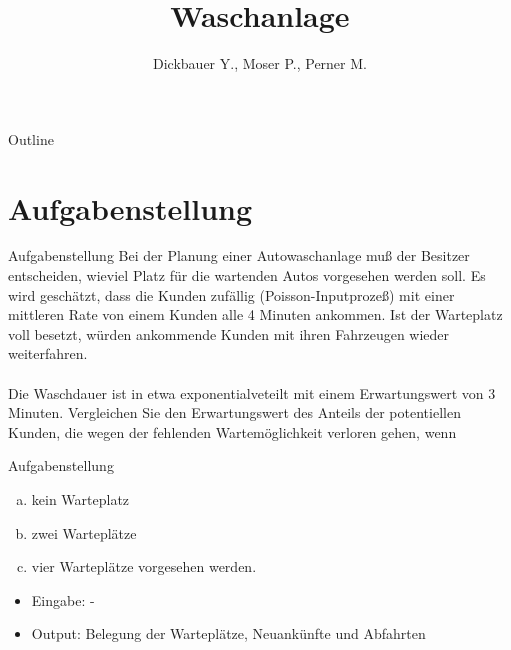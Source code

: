 

\title[BSP24 - Waschanlage]{Waschanlage}
\author{Dickbauer Y., Moser P., Perner M.}



\begin{frame}
  \titlepage
\end{frame}

\begin{frame}{Outline}
  \tableofcontents
\end{frame}

\section{Aufgabenstellung}
\begin{frame}{Aufgabenstellung}
Bei der Planung einer Autowaschanlage muß der Besitzer entscheiden, wieviel Platz für
die wartenden Autos vorgesehen werden soll. Es wird geschätzt, dass die Kunden zufällig
(Poisson-Inputprozeß) mit einer mittleren Rate von einem Kunden alle 4 Minuten ankommen.
Ist der Warteplatz voll besetzt, würden ankommende Kunden mit ihren Fahrzeugen
wieder weiterfahren. \\~\\ Die Waschdauer ist in etwa exponentialveteilt mit einem Erwartungswert
von 3 Minuten. Vergleichen Sie den Erwartungswert des Anteils der potentiellen
Kunden, die wegen der fehlenden Wartemöglichkeit verloren gehen, wenn
\end{frame}

\begin{frame}{Aufgabenstellung}
\begin{enumerate}[(a)]
	\item kein Warteplatz
	\item zwei Warteplätze
	\item vier Warteplätze vorgesehen werden.
\end{enumerate}

\begin{itemize}
  \item Eingabe: -
  \item Output: Belegung der Warteplätze, Neuankünfte und Abfahrten
\end{itemize}
\end{frame}

